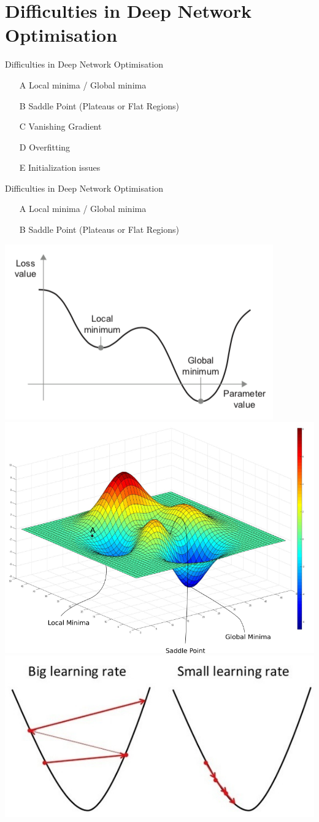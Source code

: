 \documentclass[xcolor=pdftex,dvipsnames,table,mathserif]{beamer}
\begin{document}
\section{Difficulties in Deep Network Optimisation}

\begin{frame}{Difficulties in Deep Network Optimisation}
\begin{itemize}
\item[A]{Local minima / Global minima}
\item[B]{Saddle Point (Plateaus or Flat Regions)}
\item[C]{Vanishing Gradient}
\item[D]{Overfitting}
\item[E]{Initialization issues}
\end{itemize}
\end{frame}


\begin{frame}{Difficulties in Deep Network Optimisation}
\begin{itemize}
\item[A]{Local minima / Global minima}
\item[B]{Saddle Point (Plateaus or Flat Regions)}
\end{itemize}
\includegraphics[width=.45\columnwidth]{../graphics/LocalGlobalMinimum}
\includegraphics[width=.45\columnwidth]{../graphics/challenges1} \\
\includegraphics[width=.45\columnwidth]{../graphics/BigLearningRate}
\end{frame}
\end{document}
